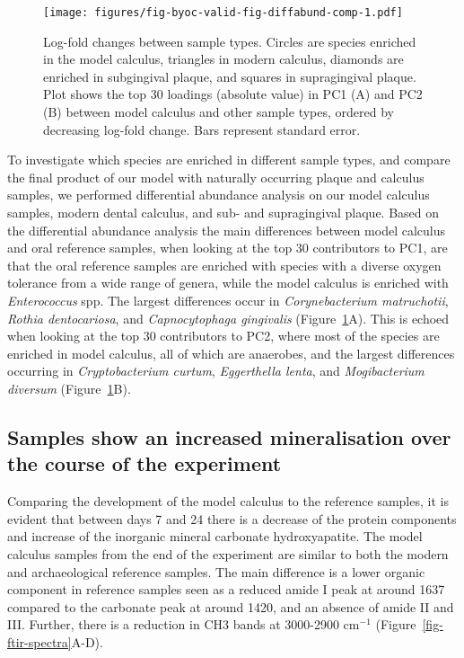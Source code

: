 \documentclass[
  letterpaper,
]{book}
\begin{document}
\begin{figure}

{\centering \texttt{[image: figures/fig-byoc-valid-fig-diffabund-comp-1.pdf]}

}

\caption{\label{fig-diffabund-comp}Log-fold changes between sample
types. Circles are species enriched in the model calculus, triangles in
modern calculus, diamonds are enriched in subgingival plaque, and
squares in supragingival plaque. Plot shows the top 30 loadings
(absolute value) in PC1 (A) and PC2 (B) between model calculus and other
sample types, ordered by decreasing log-fold change. Bars represent
standard error.}

\end{figure}

To investigate which species are enriched in different sample types, and
compare the final product of our model with naturally occurring plaque
and calculus samples, we performed differential abundance analysis on
our model calculus samples, modern dental calculus, and sub- and
supragingival plaque. Based on the differential abundance analysis the
main differences between model calculus and oral reference samples, when
looking at the top 30 contributors to PC1, are that the oral reference
samples are enriched with species with a diverse oxygen tolerance from a
wide range of genera, while the model calculus is enriched with
\emph{Enterococcus} spp. The largest differences occur in
\emph{Corynebacterium matruchotii}, \emph{Rothia dentocariosa}, and
\emph{Capnocytophaga gingivalis} (Figure~\ref{fig-diffabund-comp}A).
This is echoed when looking at the top 30 contributors to PC2, where
most of the species are enriched in model calculus, all of which are
anaerobes, and the largest differences occurring in
\emph{Cryptobacterium curtum}, \emph{Eggerthella lenta}, and
\emph{Mogibacterium diversum} (Figure~\ref{fig-diffabund-comp}B).

\hypertarget{samples-show-an-increased-mineralisation-over-the-course-of-the-experiment}{%
\subsection{Samples show an increased mineralisation over the course of
the
experiment}\label{samples-show-an-increased-mineralisation-over-the-course-of-the-experiment}}

Comparing the development of the model calculus to the reference
samples, it is evident that between days 7 and 24 there is a decrease of
the protein components and increase of the inorganic mineral carbonate
hydroxyapatite. The model calculus samples from the end of the
experiment are similar to both the modern and archaeological reference
samples. The main difference is a lower organic component in reference
samples seen as a reduced amide I peak at around 1637 compared to the
carbonate peak at around 1420, and an absence of amide II and III.
Further, there is a reduction in CH3 bands at 3000-2900 cm\(^{-1}\)
(Figure~\ref{fig-ftir-spectra}A-D).
\end{document}
